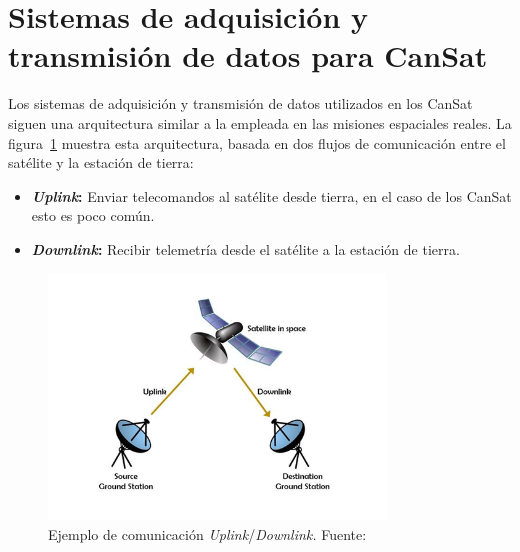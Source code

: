 \section{Sistemas de adquisición y transmisión de datos para CanSat}
Los sistemas de adquisición y transmisión de datos utilizados en los CanSat siguen una arquitectura similar a la empleada en las misiones espaciales reales.
La figura~\ref{fig:uplink_downlink} muestra esta arquitectura, basada en dos flujos de comunicación entre el satélite y la estación de tierra:

\begin{itemize}
    \item \textbf{\emph{Uplink}:} Enviar telecomandos al satélite desde tierra, en el caso de los CanSat esto es poco común.
    \item \textbf{\emph{Downlink}:} Recibir telemetría desde el satélite a la estación de tierra.
\end{itemize}

\begin{figure}
    \centering
    \includegraphics[width=0.8\textwidth]{Imagenes/Bitmap/upling_downlink}
    \caption{Ejemplo de comunicación \emph{Uplink}/\emph{Downlink.} Fuente: \cite{satnow_uplink}} 
    \label{fig:uplink_downlink}
\end{figure}

